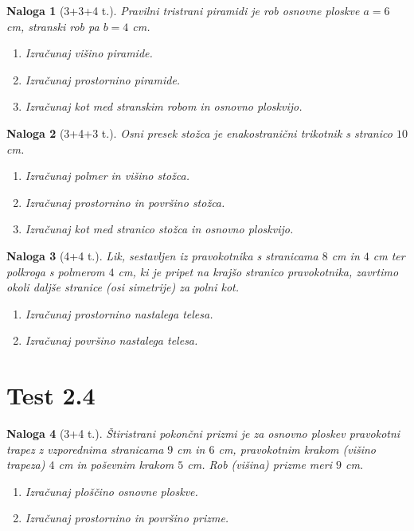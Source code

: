 \documentclass[a4paper,12pt]{article}
\theoremstyle{naloga}
\newtheorem{naloga}{Naloga}[section]
\begin{document}
\begin{naloga}[3+3+4 t.]
Pravilni tristrani piramidi je rob osnovne ploskve $a=6$ cm, stranski rob pa $b=4$ cm.
\begin{enumerate}
\item Izračunaj višino piramide.
\item Izračunaj prostornino piramide.
\item Izračunaj kot med stranskim robom in osnovno ploskvijo.
\end{enumerate}
\end{naloga}

\begin{naloga}[3+4+3 t.]
Osni presek stožca je enakostranični trikotnik s stranico $10$ cm.
\begin{enumerate}
\item Izračunaj polmer in višino stožca.
\item Izračunaj prostornino in površino stožca.
\item Izračunaj kot med stranico stožca in osnovno ploskvijo.
\end{enumerate}
\end{naloga}

\begin{naloga}[4+4 t.]
Lik, sestavljen iz pravokotnika s stranicama $8$ cm in $4$ cm ter polkroga s polmerom $4$ cm, ki je pripet na krajšo stranico pravokotnika, zavrtimo okoli daljše stranice (osi simetrije) za polni kot.
\begin{enumerate}
\item Izračunaj prostornino nastalega telesa.
\item Izračunaj površino nastalega telesa.
\end{enumerate}
\end{naloga}

\section{Test 2.4}

\begin{naloga}[3+4 t.]
Štiristrani pokončni prizmi je za osnovno ploskev pravokotni trapez z vzporednima stranicama $9$ cm in $6$ cm, pravokotnim krakom (višino trapeza) $4$ cm in poševnim krakom $5$ cm. Rob (višina) prizme meri $9$ cm.
\begin{enumerate}
\item Izračunaj ploščino osnovne ploskve.
\item Izračunaj prostornino in površino prizme.
\end{enumerate}
\end{naloga}
\end{document}
